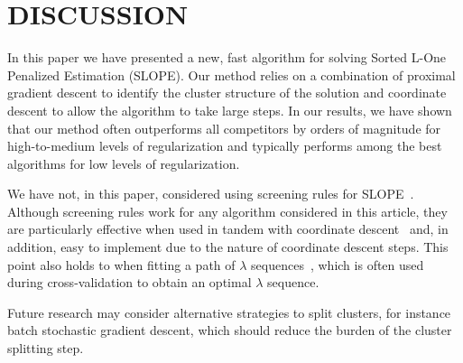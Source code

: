 \section{DISCUSSION}\label{sec:discussion}

In this paper we have presented a new, fast algorithm for solving Sorted L-One Penalized Estimation (SLOPE).
Our method relies on a combination of proximal gradient descent to identify the cluster structure of the solution and coordinate descent to allow the algorithm to take large steps.
In our results, we have shown that our method often outperforms all competitors by orders of magnitude for high-to-medium levels of regularization and typically performs among the best algorithms for low levels of regularization.

We have not, in this paper, considered using screening rules for SLOPE~\parencite{larsson2020c,elvira2022}.
Although screening rules work for any algorithm considered in this article, they are particularly effective when used in tandem with coordinate descent~\parencite{fercoq2015} and, in addition, easy to implement due to the nature of coordinate descent steps.
This point also holds to when fitting a path of \(\lambda\) sequences~\parencite{friedman2007,friedman2010}, which is often used during cross-validation to obtain an optimal \(\lambda\) sequence. 

Future research may consider alternative strategies to split clusters, for instance batch stochastic gradient descent, which should reduce the burden of the cluster splitting step.
